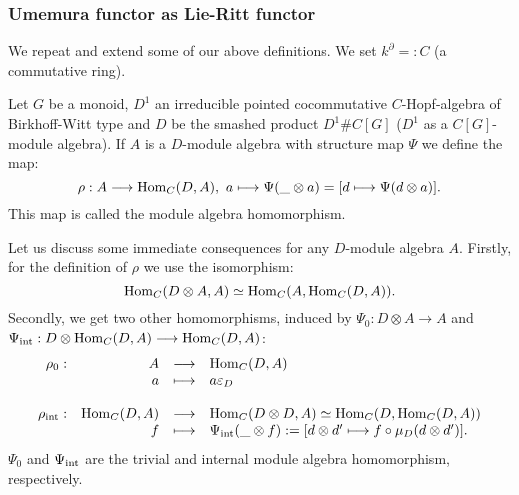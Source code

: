 \subsubsection{Umemura functor as Lie-Ritt functor}
We repeat and extend some of our above definitions. We set $k^\partial =: C$ (a commutative ring).
\begin{defi}
Let $G$ be a monoid, $D^1$ an irreducible pointed cocommutative $C$-Hopf-algebra of Birkhoff-Witt type and $D$ be the smashed product $D^1\#C[G]$ ($D^1$ as a $C[G]$-module algebra). If $A$ is a $D$-module algebra with structure map $\Psi$ %
we define the map:
$$\rho : A \longrightarrow \trm{Hom}_C(D,A),\ a \longmapsto \Psi(\_ \otimes a) = [d \longmapsto \Psi(d \otimes a)].$$
This map is called the module algebra homomorphism.
\end{defi}
\bmk Let us discuss some immediate consequences for any $D$-module algebra $A$. Firstly, for the definition of $\rho$ we use the isomorphism:
$$\trm{Hom}_C(D \otimes A, A) \simeq \trm{Hom}_C(A, \trm{Hom}_C(D,A)).$$
Secondly, we get two other homomorphisms, induced by $\Psi_0 : D \otimes A \longrightarrow A$ and $\Psi_{\trm{int}} : D \otimes \trm{Hom}_C(D,A) \longrightarrow \trm{Hom}_C(D,A)$:
$$\bao{rrcl}
\rho_0 : & A & \longrightarrow & \trm{Hom}_C(D,A)\\
& a & \longmapsto & a \eps_D\\
&&&\\
\rho_{\trm{int}} : & \trm{Hom}_C(D,A) & \longrightarrow &\trm{Hom}_C(D \otimes D,A) \simeq \trm{Hom}_C(D,\trm{Hom}_C(D,A))\\
& f & \longmapsto &\Psi_{\trm{int}}(\_ \otimes f) := [d \otimes d' \longmapsto f \circ \mu_D(d \otimes d')].\\
\ea$$
$\Psi_0$ and $\Psi_{\trm{int}}$ are the trivial and internal module algebra homomorphism, respectively.

